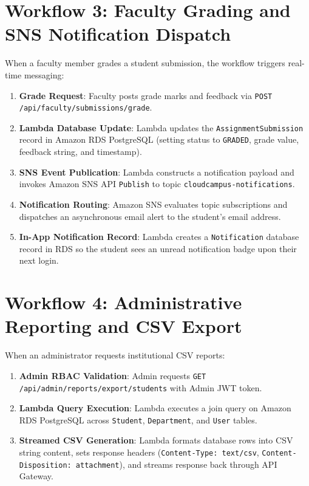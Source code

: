 \section{Workflow 3: Faculty Grading and SNS Notification Dispatch}
When a faculty member grades a student submission, the workflow triggers real-time messaging:
\begin{enumerate}
    \item \textbf{Grade Request}: Faculty posts grade marks and feedback via \texttt{POST /api/faculty/submissions/grade}.
    \item \textbf{Lambda Database Update}: Lambda updates the \texttt{AssignmentSubmission} record in Amazon RDS PostgreSQL (setting status to \texttt{GRADED}, grade value, feedback string, and timestamp).
    \item \textbf{SNS Event Publication}: Lambda constructs a notification payload and invokes Amazon SNS API \texttt{Publish} to topic \texttt{cloudcampus-notifications}.
    \item \textbf{Notification Routing}: Amazon SNS evaluates topic subscriptions and dispatches an asynchronous email alert to the student's email address.
    \item \textbf{In-App Notification Record}: Lambda creates a \texttt{Notification} database record in RDS so the student sees an unread notification badge upon their next login.
\end{enumerate}

\section{Workflow 4: Administrative Reporting and CSV Export}
When an administrator requests institutional CSV reports:
\begin{enumerate}
    \item \textbf{Admin RBAC Validation}: Admin requests \texttt{GET /api/admin/reports/export/students} with Admin JWT token.
    \item \textbf{Lambda Query Execution}: Lambda executes a join query on Amazon RDS PostgreSQL across \texttt{Student}, \texttt{Department}, and \texttt{User} tables.
    \item \textbf{Streamed CSV Generation}: Lambda formats database rows into CSV string content, sets response headers (\texttt{Content-Type: text/csv}, \texttt{Content-Disposition: attachment}), and streams response back through API Gateway.
\end{enumerate}
